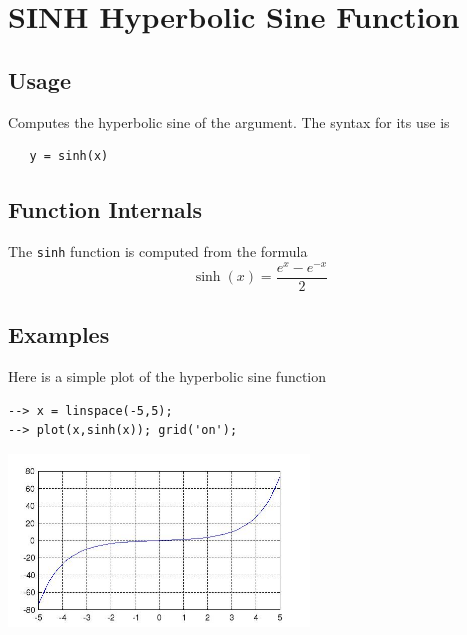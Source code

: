 \section{SINH Hyperbolic Sine Function}

\subsection{Usage}

Computes the hyperbolic sine of the argument.
The syntax for its use is
\begin{verbatim}
   y = sinh(x)
\end{verbatim}
\subsection{Function Internals}

The \verb|sinh| function is computed from the formula
\[
   \sinh(x) = \frac{e^x-e^{-x}}{2}
\]
\subsection{Examples}

Here is a simple plot of the hyperbolic sine function
\begin{verbatim}
--> x = linspace(-5,5);
--> plot(x,sinh(x)); grid('on');
\end{verbatim}


\centerline{\includegraphics[width=8cm]{sinhplot}}

